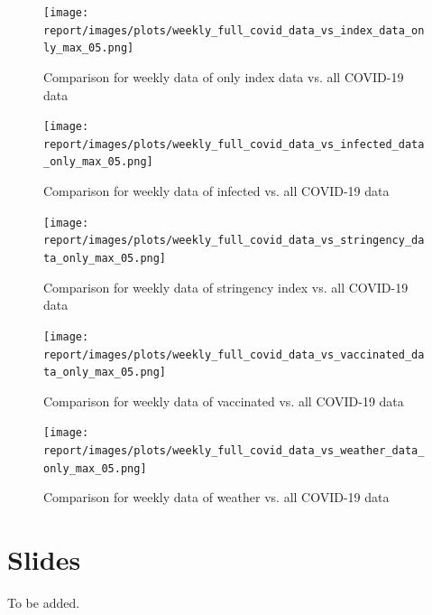 \begin{figure}[H]
    \texttt{[image: report/images/plots/weekly\_full\_covid\_data\_vs\_index\_data\_only\_max\_05.png]}
    \caption{Comparison for weekly data of only index data vs. all COVID-19 data}
\end{figure}

\begin{figure}[H]
    \texttt{[image: report/images/plots/weekly\_full\_covid\_data\_vs\_infected\_data\_only\_max\_05.png]}
    \caption{Comparison for weekly data of infected vs. all COVID-19 data}
\end{figure}

\begin{figure}[H]
    \texttt{[image: report/images/plots/weekly\_full\_covid\_data\_vs\_stringency\_data\_only\_max\_05.png]}
    \caption{Comparison for weekly data of stringency index vs. all COVID-19 data}
\end{figure}

\begin{figure}[H]
    \texttt{[image: report/images/plots/weekly\_full\_covid\_data\_vs\_vaccinated\_data\_only\_max\_05.png]}
    \caption{Comparison for weekly data of vaccinated vs. all COVID-19 data}
\end{figure}

\begin{figure}[H]
    \texttt{[image: report/images/plots/weekly\_full\_covid\_data\_vs\_weather\_data\_only\_max\_05.png]}
    \caption{Comparison for weekly data of weather vs. all COVID-19 data}
\end{figure}

\section{Slides}

To be added.